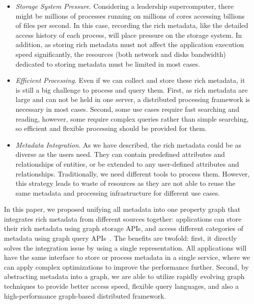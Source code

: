 \begin{itemize}

\item \textit{Storage System Pressure}. Considering a leadership supercomputer, there might be millions of processes running on millions of cores accessing billions of files per second. In this case, recording the rich metadata, like the detailed access history of each process, will place pressure on the storage system. In addition, as storing rich metadata must not affect the application execution speed significantly, the resources (both network and disks bandwidth) dedicated to storing metadata must be limited in most cases.

\item \textit{Efficient Processing}. Even if we can collect and store these rich metadata, it is still a big challenge to process and query them. First, as rich metadata are large and can not be held in one server, a distributed processing framework is necessary in most cases. Second, some use cases require fast searching and reading, however, some require complex queries rather than simple searching, so efficient and flexible processing should be provided for them.

\item \textit{Metadata Integration}. As we have described, the rich metadata could be as diverse as the users need. They can contain predefined attributes and relationships of entities, or be extended to any user-defined attributes and relationships. Traditionally, we need different tools to process them. However, this strategy leads to waste of resources as they are not able to reuse the same metadata and processing infrastructure for different use cases. %

\end{itemize}
In this paper, we proposed unifying all metadata into one property graph that integrates rich metadata from different sources together: applications can store their rich metadata using graph storage APIs, and access different categories of metadata using graph query APIs~\cite{jouili2013empirical}. The benefits are twofold: first, it directly solves the integration issue by using a single representation. All applications will have the same interface to store or process metadata in a single service, where we can apply complex optimizations to improve the performance further. Second, by abstracting metadata into a graph, we are able to utilize rapidly evolving graph techniques to provide better access speed, flexible query languages, and also a high-performance graph-based distributed framework. 

